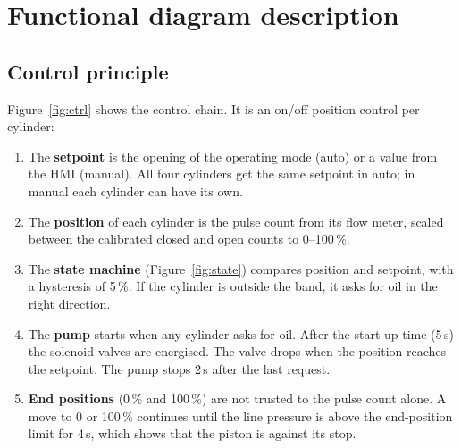 \documentclass[11pt,a4paper]{article}
\begin{document}
\section{Functional diagram description}
\label{sec:func}

\subsection{Control principle}
Figure~\ref{fig:ctrl} shows the control chain. It is an on/off position control per cylinder:
\begin{enumerate}[nosep]
  \item The \textbf{setpoint} is the opening of the operating mode (auto) or a value from the HMI
        (manual). All four cylinders get the same setpoint in auto; in manual each cylinder can have
        its own.
  \item The \textbf{position} of each cylinder is the pulse count from its flow meter, scaled
        between the calibrated closed and open counts to 0--100\,\%.
  \item The \textbf{state machine} (Figure~\ref{fig:state}) compares position and setpoint, with a
        hysteresis of 5\,\%. If the cylinder is outside the band, it asks for oil in the right
        direction.
  \item The \textbf{pump} starts when any cylinder asks for oil. After the start-up time (5\,s)
        the solenoid valves are energised. The valve drops when the position reaches the setpoint.
        The pump stops 2\,s after the last request.
  \item \textbf{End positions} (0\,\% and 100\,\%) are not trusted to the pulse count alone. A
        move to 0 or 100\,\% continues until the line pressure is above the end-position limit for
        4\,s, which shows that the piston is against its stop.
\end{enumerate}
\end{document}
